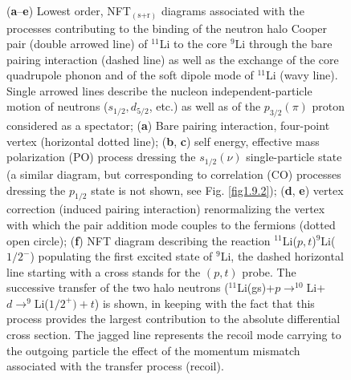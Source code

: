 \begin{figure}
          \caption[NFT$_{(\text{s+r})}$ diagrams associated with the processes contributing  to the binding of the neutron halo Cooper pair of $^{11}$Li.]{ (\textbf{a}--\textbf{e}) Lowest order, NFT$_{(\text{s+r})}$ diagrams associated with the processes contributing  to the binding of the neutron halo Cooper pair (double arrowed line) of $^{11}$Li to the core $^9$Li through the bare pairing interaction (dashed line) as well as the  exchange of the core quadrupole phonon and of the soft dipole mode of $^{11}$Li (wavy line). Single arrowed lines describe the nucleon independent-particle motion of neutrons ($s_{1/2},d_{5/2}$, etc.) as well as of the $p_{3/2}(\pi)$ proton considered as a spectator;  (\textbf{a}) Bare pairing interaction, four-point vertex (horizontal dotted line); (\textbf{b}, \textbf{c}) self energy, effective mass polarization (PO) process dressing the $s_{1/2}(\nu)$ single-particle state (a similar diagram, but corresponding to correlation (CO) processes dressing the $p_{1/2}$ state is not shown, see Fig. \ref{fig1.9.2}); (\textbf{d}, \textbf{e}) vertex correction (induced pairing interaction) renormalizing the  vertex with which the pair addition mode couples to the fermions (dotted open circle); (\textbf{f}) NFT diagram describing the reaction $^{11}$Li($p,t$)$^9$Li($1/2^-$) populating the first excited state of $^9$Li, the dashed horizontal line starting with a cross stands for the $(p,t)$ probe. The successive transfer of the two halo neutrons ($^{11}$Li(gs)+$p\rightarrow^{10}$Li+$d\rightarrow^9$Li($1/2^+)+t$) is shown, in keeping with the fact that this process provides the largest contribution to the absolute differential cross section. The jagged line represents the recoil mode carrying  to the outgoing particle the effect of the momentum mismatch associated with the transfer process (recoil). }
          \label{figintro5}
          \end{figure}
